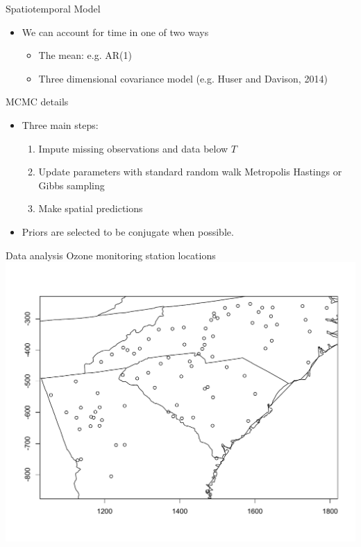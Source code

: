 \documentclass{beamer}
\begin{document}
\begin{frame}{Spatiotemporal Model}
  \begin{itemize} \setlength{\itemsep}{0.5em}
    \item We can account for time in one of two ways
    \begin{itemize}
    	\item The mean: e.g. AR(1)
	\item Three dimensional covariance model (e.g. Huser and Davison, 2014) 
    \end{itemize}
  \end{itemize}
\end{frame}

\begin{frame}{MCMC details}
  \begin{itemize} \setlength{\itemsep}{0.5em}
    \item Three main steps:
    \begin{enumerate}[1.]
      \item Impute missing observations and data below $T$
      \item Update parameters with standard random walk Metropolis Hastings or Gibbs sampling
      \item Make spatial predictions
    \end{enumerate}
    \item Priors are selected to be conjugate when possible.
  \end{itemize}
\end{frame}

\begin{frame}{Data analysis}
	\centering
	Ozone monitoring station locations
    \includegraphics[width=0.8\linewidth]{./plots/ozone_station.pdf}

\end{frame}
\end{document}
